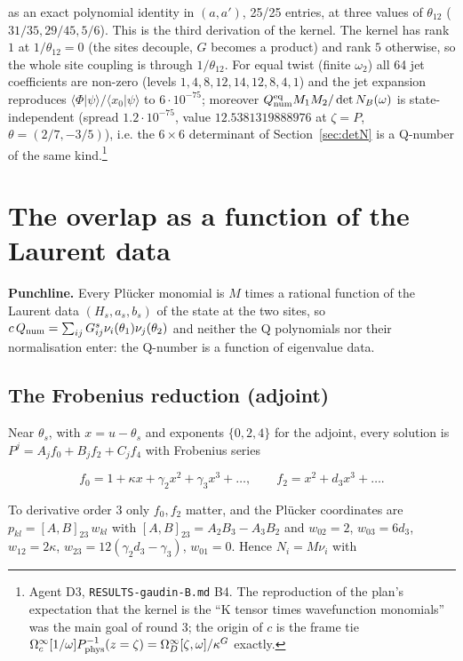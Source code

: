 \documentclass[11pt]{article}
\begin{document}
as an exact polynomial identity in $(a,a')$, 25/25 entries, at three values of $\theta_{12}$ ($31/35,29/45,5/6$).
This is the third derivation of the kernel.
The kernel has rank $1$ at $1/\theta_{12}=0$ (the sites decouple, $G$ becomes a product) and rank $5$ otherwise, so the whole site coupling is through $1/\theta_{12}$. For equal twist (finite $\omega_2$) all 64 jet coefficients are non-zero (levels $1,4,8,12,14,12,8,4,1$) and the jet expansion reproduces $\langle\Phi|\psi\rangle/\langle x_0|\psi\rangle$ to $6\cdot10^{-75}$; moreover $Q_{\rm num}^{\rm eq}M_1M_2/\det N_B(\omega)$ is state-independent (spread $1.2\cdot10^{-75}$, value $12.5381319888976$ at $\zeta=P$, $\theta=(2/7,-3/5)$), i.e. the $6\times6$ determinant of Section~\ref{sec:detN} is a Q-number of the same kind.\footnote{Agent D3, \texttt{RESULTS-\allowbreak{}gaudin-\allowbreak{}B.\allowbreak{}md} B4.
The reproduction of the plan's expectation that the kernel is the ``K tensor times wavefunction monomials'' was the main goal of round 3; the origin of $c$ is the frame tie $\Omega_c^\infty[1/\omega]P_{\rm phys}^{-1}(z=\zeta)=\Omega_D^\infty[\zeta,\omega]/\kappa^G$ exactly.}

\section{The overlap as a function of the Laurent data}\label{sec:nu}

\textbf{Punchline.} Every Plücker monomial is $M$ times a rational function of the Laurent data $(H_s,a_s,b_s)$ of the state at the two sites, so $c\,Q_{\rm num}=\sum_{ij}G^s_{ij}\nu_i(\theta_1)\nu_j(\theta_2)$ and neither the Q polynomials nor their normalisation enter: the Q-number is a function of eigenvalue data.

\subsection{The Frobenius reduction (adjoint)}\label{sec:frobred}

Near $\theta_s$, with $x=u-\theta_s$ and exponents $\{0,2,4\}$ for the adjoint, every solution is $P^j=A_jf_0+B_jf_2+C_jf_4$ with Frobenius series

\begin{equation}
f_0=1+\kappa x+\gamma_2x^2+\gamma_3x^3+\dots,\qquad f_2=x^2+d_3x^3+\dots.\label{eq:fseries}
\end{equation}

To derivative order $3$ only $f_0,f_2$ matter, and the Plücker coordinates are $p_{kl}=[A,B]_{23}\,w_{kl}$ with $[A,B]_{23}=A_2B_3-A_3B_2$ and $w_{02}=2$, $w_{03}=6d_3$, $w_{12}=2\kappa$, $w_{23}=12(\gamma_2d_3-\gamma_3)$, $w_{01}=0$. Hence $N_i=M\nu_i$ with
\end{document}
